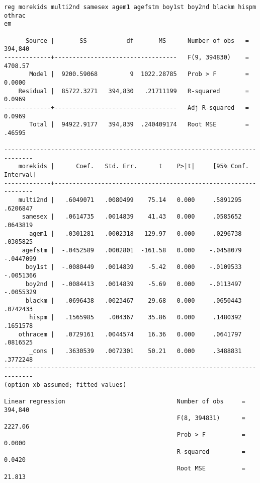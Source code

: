 \documentclass[11pt]{article}
\begin{document}
\begin{verbatim}
reg morekids multi2nd samesex agem1 agefstm boy1st boy2nd blackm hispm othrac
em

      Source |       SS           df       MS      Number of obs   =   394,840
-------------+----------------------------------   F(9, 394830)    =   4708.57
       Model |  9200.59068         9  1022.28785   Prob > F        =    0.0000
    Residual |  85722.3271   394,830   .21711199   R-squared       =    0.0969
-------------+----------------------------------   Adj R-squared   =    0.0969
       Total |  94922.9177   394,839  .240409174   Root MSE        =    .46595

------------------------------------------------------------------------------
    morekids |      Coef.   Std. Err.      t    P>|t|     [95% Conf. Interval]
-------------+----------------------------------------------------------------
    multi2nd |   .6049071   .0080499    75.14   0.000     .5891295    .6206847
     samesex |   .0614735   .0014839    41.43   0.000     .0585652    .0643819
       agem1 |   .0301281   .0002318   129.97   0.000     .0296738    .0305825
     agefstm |  -.0452589   .0002801  -161.58   0.000    -.0458079   -.0447099
      boy1st |  -.0080449   .0014839    -5.42   0.000    -.0109533   -.0051366
      boy2nd |  -.0084413   .0014839    -5.69   0.000    -.0113497   -.0055329
      blackm |   .0696438   .0023467    29.68   0.000     .0650443    .0742433
       hispm |   .1565985    .004367    35.86   0.000     .1480392    .1651578
    othracem |   .0729161   .0044574    16.36   0.000     .0641797    .0816525
       _cons |   .3630539   .0072301    50.21   0.000     .3488831    .3772248
------------------------------------------------------------------------------
(option xb assumed; fitted values)

Linear regression                               Number of obs     =    394,840
                                                F(8, 394831)      =    2227.06
                                                Prob > F          =     0.0000
                                                R-squared         =     0.0420
                                                Root MSE          =     21.813


\end{verbatim}
\end{document}
